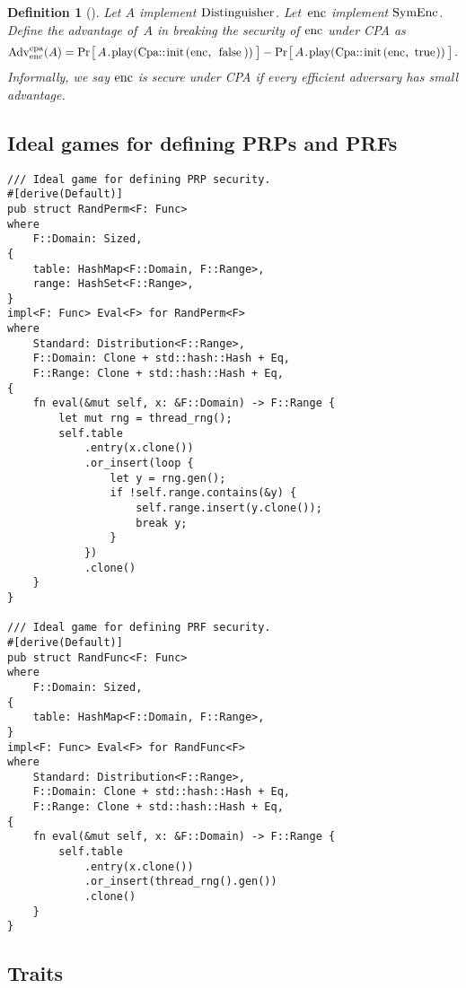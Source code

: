 \documentclass{article}
\newtheorem{definition}{Definition}
\newcommand{\Adv}[1]{\textrm{\textup{Adv}}^{\textup{#1}}}
\newcommand{\Prob}[1]{\Pr\hspace{-1pt}\big[\,#1\,\big]}
\newcommand{\code}[1]{\textrm{\textup{\lstinline{#1}}}}
\begin{document}
\begin{definition}[{\cite[Definition 7.1]{joy}}]
  Let $A$ implement \hyperref[sec/traits]{$\code{Distinguisher}$}.
  Let~$\code{enc}$ implement \hyperref[fig/symenc/syntax]{$\code{SymEnc}$}.
  Define the advantage of~$A$ in breaking the security of $\code{enc}$ under CPA
  as
  \[
    \Adv{cpa}_{\code{enc}}(A) =
      \Prob{A\code{.play(Cpa::init(enc, false))}} -
      \Prob{A\code{.play(Cpa::init(enc, true))}} \,.
  \]
  Informally, we say $\code{enc}$ is secure under CPA if every efficient adversary
  has small advantage.
\end{definition}


\subsection{Ideal games for defining PRPs and PRFs}
\label{sec/func/ideal}

\begin{lstlisting}
/// Ideal game for defining PRP security.
#[derive(Default)]
pub struct RandPerm<F: Func>
where
    F::Domain: Sized,
{
    table: HashMap<F::Domain, F::Range>,
    range: HashSet<F::Range>,
}
impl<F: Func> Eval<F> for RandPerm<F>
where
    Standard: Distribution<F::Range>,
    F::Domain: Clone + std::hash::Hash + Eq,
    F::Range: Clone + std::hash::Hash + Eq,
{
    fn eval(&mut self, x: &F::Domain) -> F::Range {
        let mut rng = thread_rng();
        self.table
            .entry(x.clone())
            .or_insert(loop {
                let y = rng.gen();
                if !self.range.contains(&y) {
                    self.range.insert(y.clone());
                    break y;
                }
            })
            .clone()
    }
}

/// Ideal game for defining PRF security.
#[derive(Default)]
pub struct RandFunc<F: Func>
where
    F::Domain: Sized,
{
    table: HashMap<F::Domain, F::Range>,
}
impl<F: Func> Eval<F> for RandFunc<F>
where
    Standard: Distribution<F::Range>,
    F::Domain: Clone + std::hash::Hash + Eq,
    F::Range: Clone + std::hash::Hash + Eq,
{
    fn eval(&mut self, x: &F::Domain) -> F::Range {
        self.table
            .entry(x.clone())
            .or_insert(thread_rng().gen())
            .clone()
    }
}
\end{lstlisting}

\subsection{Traits}
\label{sec/traits}
\end{document}
